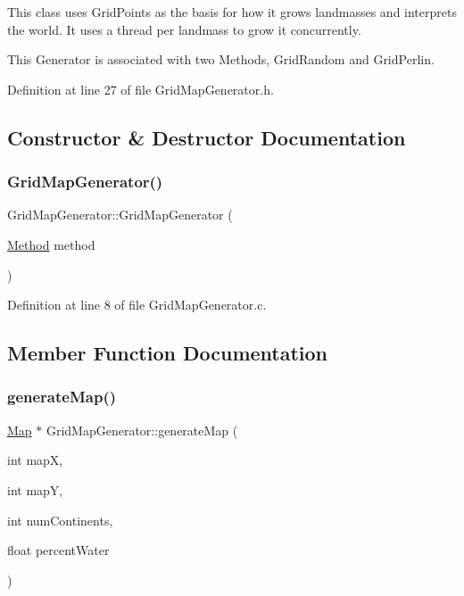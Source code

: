 This class uses Grid\+Points as the basis for how it grows landmasses and interprets the world. It uses a thread per landmass to grow it concurrently.

This Generator is associated with two Methods, Grid\+Random and Grid\+Perlin. 

Definition at line 27 of file Grid\+Map\+Generator.\+h.



\subsection{Constructor \& Destructor Documentation}
\mbox{\label{class_world_architect_1_1_grid_map_generator_a1e1a93116b9dac21c9e1c02ab46c3431}} 
\subsubsection{\texorpdfstring{GridMapGenerator()}{GridMapGenerator()}}
{\footnotesize\ttfamily Grid\+Map\+Generator\+::\+Grid\+Map\+Generator (\begin{DoxyParamCaption}\item[{\mbox{\hyperlink{namespace_world_architect_a9bb4333e2d555bf42bf7d14ec2a2ae7b}{Method}}}]{method }\end{DoxyParamCaption})}



Definition at line 8 of file Grid\+Map\+Generator.\+c.



\subsection{Member Function Documentation}
\mbox{\label{class_world_architect_1_1_grid_map_generator_a7155387434e6d740c487eeade985f78d}} 
\subsubsection{\texorpdfstring{generateMap()}{generateMap()}}
{\footnotesize\ttfamily \mbox{\hyperlink{class_world_architect_1_1_map}{Map}} $\ast$ Grid\+Map\+Generator\+::generate\+Map (\begin{DoxyParamCaption}\item[{int}]{mapX,  }\item[{int}]{mapY,  }\item[{int}]{num\+Continents,  }\item[{float}]{percent\+Water }\end{DoxyParamCaption})\hspace{0.3cm}{\ttfamily [virtual]}}


